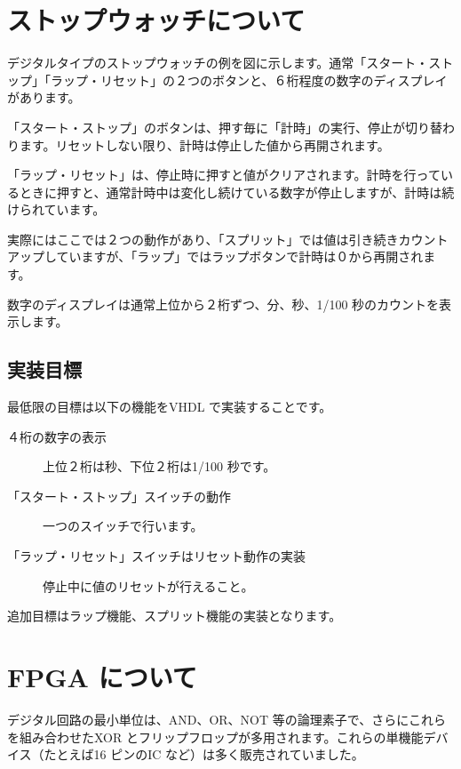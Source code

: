 \documentclass[letterpaper,10pt,dvipdfmx]{sphinxmanual}
\begin{document}
\chapter{ストップウォッチについて}
\label{02_stopwatch::doc}\label{02_stopwatch:id1}
デジタルタイプのストップウォッチの例を図に示します。通常「スタート・ストップ」「ラップ・リセット」の２つのボタンと、６桁程度の数字のディスプレイがあります。

「スタート・ストップ」のボタンは、押す毎に「計時」の実行、停止が切り替わります。リセットしない限り、計時は停止した値から再開されます。

「ラップ・リセット」は、停止時に押すと値がクリアされます。計時を行っているときに押すと、通常計時中は変化し続けている数字が停止しますが、計時は続けられています。

実際にはここでは２つの動作があり、「スプリット」では値は引き続きカウントアップしていますが、「ラップ」ではラップボタンで計時は０から再開されます。

数字のディスプレイは通常上位から２桁ずつ、分、秒、1/100 秒のカウントを表示します。


\section{実装目標}
\label{02_stopwatch:id2}
最低限の目標は以下の機能をVHDL で実装することです。
\begin{description}
\item[{４桁の数字の表示}] \leavevmode
上位２桁は秒、下位２桁は1/100 秒です。

\item[{「スタート・ストップ」スイッチの動作}] \leavevmode
一つのスイッチで行います。

\item[{「ラップ・リセット」スイッチはリセット動作の実装}] \leavevmode
停止中に値のリセットが行えること。

\end{description}

追加目標はラップ機能、スプリット機能の実装となります。


\chapter{FPGA について}
\label{03_fpga:fpga}\label{03_fpga::doc}
デジタル回路の最小単位は、AND、OR、NOT 等の論理素子で、さらにこれらを組み合わせたXOR とフリップフロップが多用されます。これらの単機能デバイス（たとえば16 ピンのIC など）は多く販売されていました。
\end{document}

